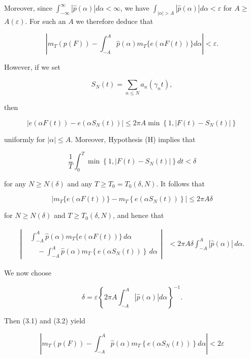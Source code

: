 \documentclass[10pt]{article}
\begin{document}
Moreover, since $\int_{-\infty}^{\infty}|\widehat{p}(\alpha)| d \alpha<\infty$, we have $\int_{|\alpha|>A}|\widehat{p}(\alpha)| d \alpha<\varepsilon$ for $A \geq$ $A(\varepsilon)$. For such an $A$ we therefore deduce that


\begin{equation*}
\left|m_{T}(p(F))-\int_{-A}^{A} \widehat{p}(\alpha) m_{T}\{e(\alpha F(t))\} d \alpha\right|<\varepsilon. \tag{3.1}
\end{equation*}


However, if we set

$$
S_{N}(t)=\sum_{n \leq N} a_{n}\left(\gamma_{n} t\right),
$$

then

$$
\left|e(\alpha F(t))-e\left(\alpha S_{N}(t)\right)\right| \leq 2 \pi A \min \left\{1,\left|F(t)-S_{N}(t)\right|\right\}
$$

uniformly for $|\alpha| \leq A$. Moreover, Hypothesis (H) implies that

$$
\frac{1}{T} \int_{0}^{T} \min \left\{1,\left|F(t)-S_{N}(t)\right|\right\} d t<\delta
$$

for any $N \geq N(\delta)$ and any $T \geq T_{0}=T_{0}(\delta, N)$. It follows that

$$
\left|m_{T}\{e(\alpha F(t))\}-m_{T}\left\{e\left(\alpha S_{N}(t)\right)\right\}\right| \leq 2 \pi A \delta
$$

for $N \geq N(\delta)$ and $T \geq T_{0}(\delta, N)$, and hence that


\begin{align*}
\left|
\begin{aligned}
&\int_{-A}^{A}\widehat{p}(\alpha)m_{T}\{e(\alpha F(t))\}\,d\alpha \\
&\quad-\int_{-A}^{A}\widehat{p}(\alpha)m_{T}\!\left\{e\left(\alpha S_{N}(t)\right)\right\}\,d\alpha
\end{aligned}
\right|
&<2\pi A\delta\int_{-A}^{A}|\widehat{p}(\alpha)|\,d\alpha. \tag{3.2}
\end{align*}


We now choose

$$
\delta=\varepsilon\left\{2 \pi A \int_{-A}^{A}|\widehat{p}(\alpha)| d \alpha\right\}^{-1} .
$$

Then (3.1) and (3.2) yield


\begin{equation*}
\left|m_{T}(p(F))-\int_{-A}^{A} \widehat{p}(\alpha) m_{T}\left\{e\left(\alpha S_{N}(t)\right)\right\} d \alpha\right|<2 \varepsilon \tag{3.3}
\end{equation*}
\end{document}
